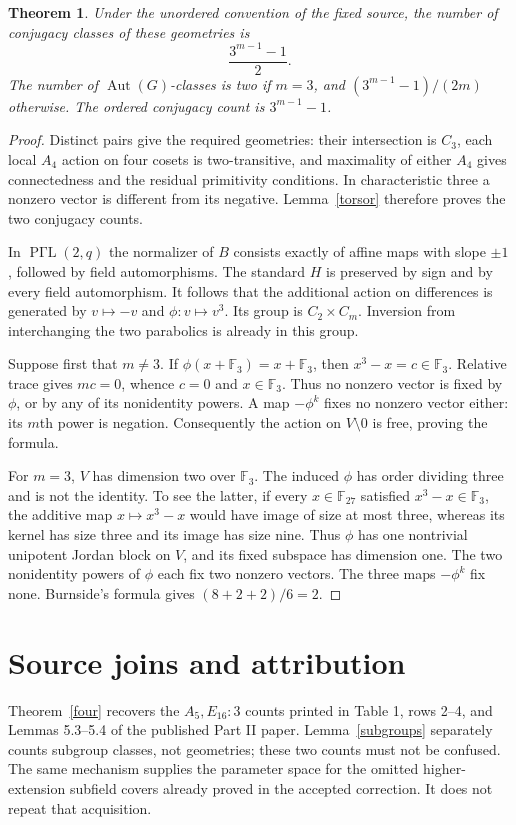 \documentclass[11pt]{article}
\newtheorem{theorem}{Theorem}
\newcommand{\F}{\mathbb F}
\newcommand{\Aut}{\operatorname{Aut}}
\begin{document}
\begin{theorem}\label{three}
Under the unordered convention of the fixed source, the number of
conjugacy classes of these geometries is
\[
 \frac{3^{m-1}-1}{2}.
\]
The number of $\Aut(G)$-classes is two if $m=3$, and
$(3^{m-1}-1)/(2m)$ otherwise. The ordered conjugacy count is
$3^{m-1}-1$.
\end{theorem}
\begin{proof}
Distinct pairs give the required geometries: their intersection is $C_3$,
each local $A_4$ action on four cosets is two-transitive, and maximality
of either $A_4$ gives connectedness and the residual primitivity conditions.
In characteristic three a nonzero vector is different from its negative.
Lemma~\ref{torsor} therefore proves the two conjugacy counts.

In $\operatorname{P\Gamma L}(2,q)$ the normalizer of $B$ consists
exactly of affine maps with slope $\pm1$, followed by field automorphisms.
The standard $H$ is preserved by sign and by every field automorphism.
It follows that the additional action on differences is generated by
$v\mapsto-v$ and $\phi:v\mapsto v^3$. Its group is $C_2\times C_m$.
Inversion from interchanging the two parabolics is already in this group.

Suppose first that $m\ne3$. If $\phi(x+\F_3)=x+\F_3$, then
$x^3-x=c\in\F_3$. Relative trace gives $mc=0$, whence $c=0$
and $x\in\F_3$. Thus no nonzero vector is fixed by $\phi$, or by
any of its nonidentity powers. A map $-\phi^k$ fixes no nonzero vector
either: its $m$th power is negation. Consequently the action on
$V\setminus0$ is free, proving the formula.

For $m=3$, $V$ has dimension two over $\F_3$. The induced $\phi$
has order dividing three and is not the identity. To see the latter,
if every $x\in\F_{27}$ satisfied $x^3-x\in\F_3$, the additive
map $x\mapsto x^3-x$ would have image of size at most three, whereas
its kernel has size three and its image has size nine. Thus $\phi$
has one nontrivial unipotent Jordan block on $V$, and its fixed subspace
has dimension one. The two nonidentity powers of $\phi$ each fix two
nonzero vectors. The three maps $-\phi^k$ fix none. Burnside's formula
gives $(8+2+2)/6=2$.
\end{proof}

\section{Source joins and attribution}
Theorem~\ref{four} recovers the $A_5,E_{16}:3$ counts printed in
Table 1, rows 2--4, and Lemmas 5.3--5.4 of the published Part II paper.
Lemma~\ref{subgroups} separately counts subgroup classes, not geometries;
these two counts must not be confused. The same mechanism supplies the
parameter space for the omitted higher-extension subfield covers already
proved in the accepted correction. It does not repeat that acquisition.
\end{document}
